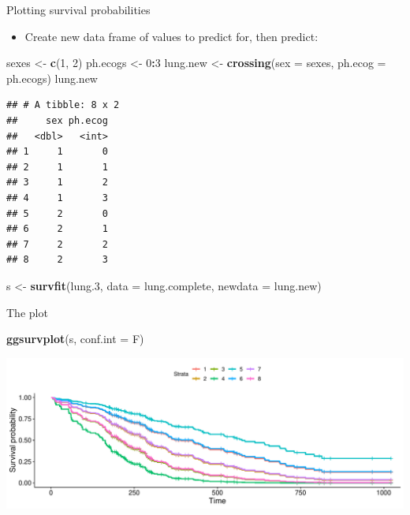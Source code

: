 \documentclass[
  ignorenonframetext,
]{beamer}
\newenvironment{Shaded}{\begin{snugshade}}{\end{snugshade}}
\newcommand{\DataTypeTok}[1]{\textcolor[rgb]{0.13,0.29,0.53}{#1}}
\newcommand{\DecValTok}[1]{\textcolor[rgb]{0.00,0.00,0.81}{#1}}
\newcommand{\FloatTok}[1]{\textcolor[rgb]{0.00,0.00,0.81}{#1}}
\newcommand{\KeywordTok}[1]{\textcolor[rgb]{0.13,0.29,0.53}{\textbf{#1}}}
\newcommand{\NormalTok}[1]{#1}
\newcommand{\OperatorTok}[1]{\textcolor[rgb]{0.81,0.36,0.00}{\textbf{#1}}}
\newcommand{\StringTok}[1]{\textcolor[rgb]{0.31,0.60,0.02}{#1}}
\providecommand{\tightlist}{%
  \setlength{\itemsep}{0pt}\setlength{\parskip}{0pt}}
\begin{document}
\begin{frame}[fragile]{Plotting survival probabilities}
\protect\hypertarget{plotting-survival-probabilities-1}{}

\begin{itemize}
\tightlist
\item
  Create new data frame of values to predict for, then predict:
\end{itemize}

\footnotesize

\begin{Shaded}
\begin{Highlighting}[]
\NormalTok{sexes <-}\StringTok{ }\KeywordTok{c}\NormalTok{(}\DecValTok{1}\NormalTok{, }\DecValTok{2}\NormalTok{)}
\NormalTok{ph.ecogs <-}\StringTok{ }\DecValTok{0}\OperatorTok{:}\DecValTok{3}
\NormalTok{lung.new <-}\StringTok{ }\KeywordTok{crossing}\NormalTok{(}\DataTypeTok{sex =}\NormalTok{ sexes, }\DataTypeTok{ph.ecog =}\NormalTok{ ph.ecogs)}
\NormalTok{lung.new}
\end{Highlighting}
\end{Shaded}

\begin{verbatim}
## # A tibble: 8 x 2
##     sex ph.ecog
##   <dbl>   <int>
## 1     1       0
## 2     1       1
## 3     1       2
## 4     1       3
## 5     2       0
## 6     2       1
## 7     2       2
## 8     2       3
\end{verbatim}

\begin{Shaded}
\begin{Highlighting}[]
\NormalTok{s <-}\StringTok{ }\KeywordTok{survfit}\NormalTok{(lung}\FloatTok{.3}\NormalTok{, }\DataTypeTok{data =}\NormalTok{ lung.complete, }\DataTypeTok{newdata =}\NormalTok{ lung.new)}
\end{Highlighting}
\end{Shaded}

\normalsize

\end{frame}

\begin{frame}[fragile]{The plot}
\protect\hypertarget{the-plot-4}{}

\begin{Shaded}
\begin{Highlighting}[]
\KeywordTok{ggsurvplot}\NormalTok{(s, }\DataTypeTok{conf.int =}\NormalTok{ F)}
\end{Highlighting}
\end{Shaded}

\includegraphics{slides_d29_files/figure-beamer/unnamed-chunk-179-1.pdf}

\end{frame}
\end{document}
